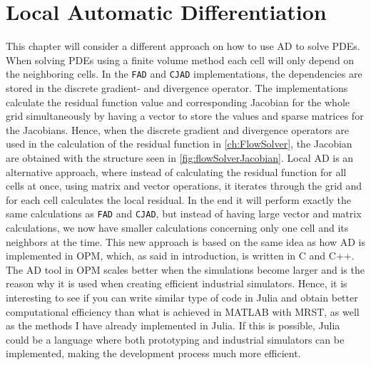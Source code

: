 \chapter{Local Automatic Differentiation}
\label{ch:LocalAD}
This chapter will consider a different approach on how to use AD to solve PDEs. When solving PDEs using a finite volume method each cell will only depend on the neighboring cells. In the \texttt{FAD} and \texttt{CJAD} implementations, the dependencies are stored in the discrete gradient- and divergence operator. The implementations calculate the residual function value and corresponding Jacobian for the whole grid simultaneously by having a vector to store the values and sparse matrices for the Jacobians. Hence, when the discrete gradient and divergence operators are used in the calculation of the residual function in \autoref{ch:FlowSolver}, the Jacobian are obtained with the structure seen in \autoref{fig:flowSolverJacobian}. Local AD is an alternative approach, where instead of calculating the residual function for all cells at once, using matrix and vector operations, it iterates through the grid and for each cell calculates the local residual. In the end it will perform exactly the same calculations as \texttt{FAD} and \texttt{CJAD}, but instead of having large vector and matrix calculations, we now have smaller calculations concerning only one cell and its neighbors at the time. This new approach is based on the same idea as how AD is implemented in OPM, which, as said in introduction, is written in C and C++. The AD tool in OPM scales better when the simulations become larger and is the reason why it is used when creating efficient industrial simulators. Hence, it is interesting to see if you can write similar type of code in Julia and obtain better computational efficiency than what is achieved in MATLAB with MRST, as well as the methods I have already implemented in Julia. If this is possible, Julia could be a language where both prototyping and industrial simulators can be implemented, making the development process much more efficient. 


